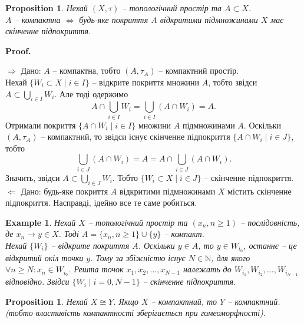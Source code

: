 \documentclass[a4paper, 10pt]{article}
\makeatletter
\def\rightproof{$\boxed{\Rightarrow}$ }
\def\leftproof{$\boxed{\Leftarrow}$ }
\theoremstyle{theoremdd}
\newtheorem{example}[theorem]{Example}
\newtheorem{proposition}[theorem]{Proposition}
\renewenvironment{proof}[1][Proof.\\]{\par
\pushQED{\hfill \qed}%
\normalfont \topsep6\p@\@plus6\p@\relax
\trivlist
\item\relax
{\bfseries
#1\@addpunct{.}}\hspace\labelsep\ignorespaces
}{%
\popQED\endtrivlist\@endpefalse
}
\makeatother
\begin{document}
\begin{proposition}
Нехай $(X,\tau)$ -- топологічний простір та $A \subset X$.\\
$A$ -- компактна $\iff$ будь-яке покриття $A$ відкритими підмножинами $X$ має скінченне підпокриття.
\end{proposition}

\begin{proof}
\rightproof Дано: $A$ -- компактна, тобто $(A,\tau_A)$ -- компактний простір. \\
Нехай $\{W_i \subset X \mid i \in I\}$ -- відкрите покриття множини $A$, тобто звідси $A \subset \displaystyle\bigcup_{i \in I} W_i$. Але тоді одержимо
\[
A \cap \displaystyle\bigcup_{i \in I} W_i = \bigcup_{i \in I} (A \cap W_i) = A.
\] Отримали покриття $\{ A \cap W_i \mid i \in I\}$ множини $A$ підмножинами $A$. Оскільки $(A,\tau_A)$ -- компактний, то звідси існує скінченне підпокриття $\{ A \cap W_i \mid i \in J\}$, тобто 
\[
\displaystyle\bigcup_{i \in J} (A \cap W_i) = A = A \cap \bigcup_{i \in J} (A \cap W_i).
\]
Значить, звідси $A \subset \displaystyle\bigcup_{i \in J} W_i$. Тобто $\{W_i \subset X \mid i \in J\}$ -- скінченне підпокриття.
\bigskip \\
\leftproof Дано: будь-яке покриття $A$ відкритими підмножинами $X$ містить скінченне підпокриття. Насправді, ідейно все те саме робиться.
\end{proof}

\begin{example}
Нехай $X$ -- топологічний простір та $(x_n, n \geq 1)$ -- послідовність, де $x_n \to y \in X$. Тоді $A = \{x_n, n \geq 1\} \cup \{y\}$ -- компакт.
\bigskip \\
Нехай $\{W_i\}$ -- відкрите покриття $A$. Оскільки $y \in A$, то $y \in W_{i_0}$, останнє -- це відкритий окіл точки $y$. Тому за збіжністю існує $N \in \mathbb{N}$, для якого $\forall n \geq N: x_n \in W_{i_0}$. Решта точок $x_1,x_2,\dots,x_{N-1}$ належать до $W_{i_1},W_{i_2},\dots,W_{i_{N-1}}$ відповідно. Звідси $\{ W_i \mid i = \overline{0,N-1} \}$ -- скінченне підпокриття. 
\end{example}

\begin{proposition}
Нехай $X \cong Y$. Якщо $X$ -- компактний, то $Y$ -- компактний.\\
(\textit{тобто властивість компактності зберігається при гомеоморфності}).
\end{proposition}
\end{document}
